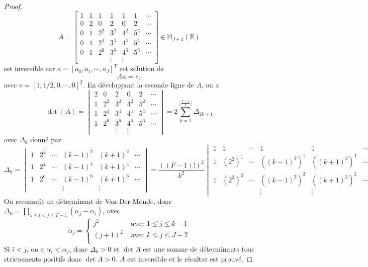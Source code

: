 \begin{proof}
\begin{equation}
A=\begin{bmatrix}
1 &  1  &  1  &  1  &  1  &  1  & \cdots\\  
0 &  2  &  0  &  2  &  0  & 2  & \cdots\\
0 &  1  & 2^2 & 3^2 & 4^2 & 5^2 & \cdots\\
0 &  1  & 2^4 & 3^4 & 4^4 & 5^4 & \cdots\\
0 &  1  & 2^6 & 3^6 & 4^6 & 5^6 & \cdots\\
&&& \vdots &  \vdots &
\end{bmatrix} \in \mathbb{M}_{J+1} \left( \mathbb{R} \right)
\end{equation}
est inversible car $a = [a_0, a_1, \cdots, a_J]^T$ est solution de 
\begin{equation}
A a = e_1
\end{equation}
avec $e = [1,1/2, 0,\cdots,0]^T$. En développant la seconde ligne de $A$, on a
\begin{equation}
\det ( A ) = \begin{vmatrix} 
2  &  0  &  2  &  0  & 2  & \cdots\\
1  & 2^2 & 3^2 & 4^2 & 5^2 & \cdots\\
1  & 2^4 & 3^4 & 4^4 & 5^4 & \cdots\\
1  & 2^6 & 3^6 & 4^6 & 5^6 & \cdots\\
& & \vdots &  \vdots &
\end{vmatrix} = 2 \sum_{k=1}^{\lfloor\frac{F-1}{2}\rfloor} \Delta_{2k+1}
\end{equation}
avec $\Delta_k$ donné par
\begin{equation}
\Delta_k = \begin{vmatrix} 
1 & 2^2 & \cdots & (k-1)^2 & (k+1)^2 & \cdots\\
1 & 2^4 & \cdots & (k-1)^4 & (k+1)^4 & \cdots\\
1 & 2^6 & \cdots & (k-1)^6 & (k+1)^6 & \cdots\\
&&& \vdots &  \vdots &
\end{vmatrix} = \dfrac{((F-1)!)^2}{k^2} \begin{vmatrix} 
1 & 1 & \cdots & 1 & 1 & \cdots\\
1 & (2^2)^1 & \cdots & ((k-1)^2)^1 & ((k+1)^2)^1 & \cdots\\
1 & (2^2)^2 & \cdots & ((k-1)^2)^2 & ((k+1)^2)^2 & \cdots\\
&&& \vdots &  \vdots &
\end{vmatrix}
\end{equation}
On reconnaît un déterminant de Van-Der-Monde, donc $\Delta_k = \prod_{1 \leq i < j \leq F-1} \left( \alpha_j - \alpha_i \right)$, avec 
\begin{equation}
\alpha_j = \left\lbrace
\begin{array}{ll}
j^2 & \text{ avec } 1 \leq j \leq k-1\\
(j+1)^2 & \text{ avec } k \leq j \leq J-2\\
\end{array}
\right.
\end{equation}
Si $i<j$, on a $\alpha_i < \alpha_j$, donc $\Delta_k>0$ et $\det A$ est une somme de déterminants tous strictements positifs donc $\det A > 0$. $A$ est inversible et le résultat est prouvé.
\end{proof}
